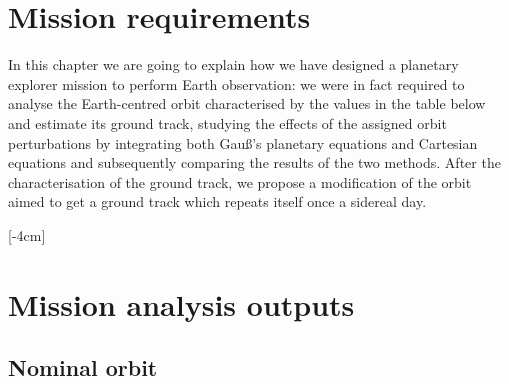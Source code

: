\documentclass[11pt,a4paper]{report}
\begin{document}
\chapter{Mission requirements}
In this chapter we are going to explain how we have designed a planetary explorer
mission to perform Earth observation: we were in fact required to analyse the Earth-centred orbit characterised by the values in the table below and estimate its ground track, studying the effects of the assigned orbit perturbations by integrating both Gauß’s planetary equations and Cartesian equations and subsequently comparing the results of the two methods. After the characterisation of the ground track, we propose a modification of the orbit aimed to get a ground track which repeats itself once a sidereal day.\\

\begin{table}[H]
\centering
{}
\caption{Mission requirements}
\label{tab:Mission_requirements}
\end{table}

[-4cm]

\chapter{Mission analysis outputs}

\section{Nominal orbit}
\end{document}
